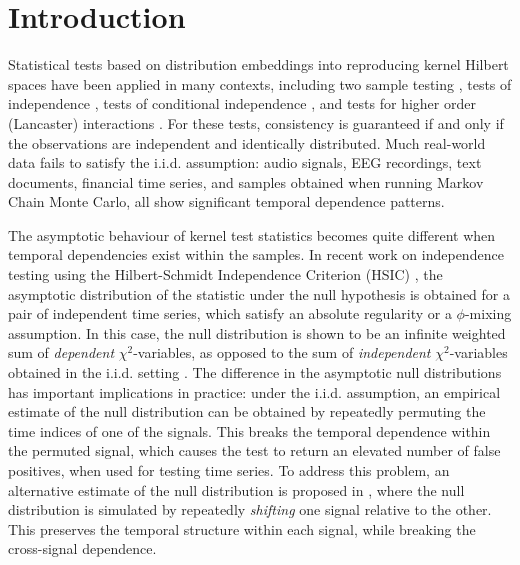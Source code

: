 \section{Introduction}
\vspace{-2.5mm}


Statistical tests based on distribution embeddings into reproducing kernel Hilbert spaces have been applied in many contexts,  including two sample testing \cite{HarBacMou08,gretton2012kernel,SugSuzItoKanetal11}, tests of independence \cite{gretton_kernel_2008,ZhaPetJanSch11,besserve_statistical_2013}, tests of conditional independence  \cite{fukumizu2007kernel,ZhaPetJanSch11}, and tests for higher order (Lancaster) interactions \cite{sejdinovic2013kernel}. %
For these tests,  consistency is guaranteed if and only if the observations are independent and identically distributed. 
Much real-world data fails to satisfy the i.i.d. assumption: audio signals, EEG recordings, text documents, financial time series, and samples obtained when running Markov Chain Monte Carlo, all show  significant temporal dependence patterns.  

The asymptotic behaviour of kernel test statistics becomes quite different when temporal dependencies exist within
the samples.
In recent work on independence testing using the Hilbert-Schmidt Independence
Criterion (HSIC) \cite{chwialkowski2014kernel}, the asymptotic distribution of the statistic under the null hypothesis is obtained for a pair of independent time series, which satisfy an absolute regularity or a $\phi$-mixing assumption.
In this case, the null distribution is shown to be an infinite weighted sum of {\em dependent} $\chi^2$-variables,
as opposed to the sum of \emph{independent} $\chi^2$-variables obtained in the i.i.d. setting \cite{gretton_kernel_2008}.
The difference in the asymptotic null distributions has important implications in practice:
under the i.i.d. assumption, an empirical estimate of the null distribution can be obtained by
repeatedly permuting the time indices of one of the signals. This breaks
the temporal dependence within the permuted signal, which causes the test to return an elevated
number of false positives, when used for testing time series. To address this problem, an alternative estimate of the null distribution
is proposed in \cite{chwialkowski2014kernel}, where the null distribution is simulated by repeatedly
{\em shifting} one
signal relative to the other. This preserves the temporal structure within each signal, while breaking the cross-signal
dependence.

